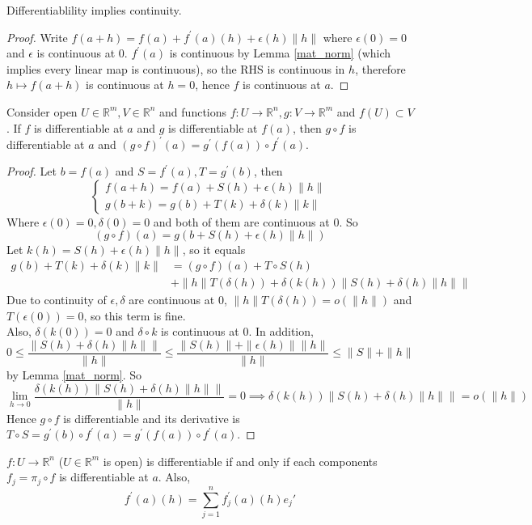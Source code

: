 \begin{proposition}
    Differentiablility implies continuity.
\end{proposition}
\begin{proof}
    Write $f(a+h)=f(a)+f^\prime(a)(h)+\epsilon(h)\|h\|$ where $\epsilon(0)=0$ and $\epsilon$ is continuous at $0$.
    $f^\prime(a)$ is continuous by Lemma \ref{mat_norm} (which implies every linear map is continuous), so the RHS is continuous in $h$, therefore $h\mapsto f(a+h)$ is continuous at $h=0$, hence $f$ is continuous at $a$.
\end{proof}
\begin{proposition}
    Consider open $U\in\mathbb R^m,V\in\mathbb R^n$ and functions $f:U\to\mathbb R^n,g:V\to\mathbb R^m$ and $f(U)\subset V$.
    If $f$ is differentiable at $a$ and $g$ is differentiable at $f(a)$, then $g\circ f$ is differentiable at $a$ and $(g\circ f)^\prime(a)=g^\prime(f(a))\circ f^\prime(a)$.
\end{proposition}
\begin{proof}
    Let $b=f(a)$ and $S=f^\prime(a),T=g^\prime(b)$, then
    $$
    \begin{cases}
        f(a+h)=f(a)+S(h)+\epsilon(h)\|h\|\\
        g(b+k)=g(b)+T(k)+\delta(k)\|k\|
    \end{cases}
    $$
    Where $\epsilon(0)=0,\delta(0)=0$ and both of them are continuous at $0$.
    So 
    $$(g\circ f)(a)=g(b+S(h)+\epsilon(h)\|h\|)$$
    Let $k(h)=S(h)+\epsilon(h)\|h\|$, so it equals
    \begin{align*}
        g(b)+T(k)+\delta(k)\|k\|&=(g\circ f)(a)+T\circ S(h)\\
        &+\|h\|T(\delta(h))+\delta(k(h))\|S(h)+\delta(h)\|h\|\|
    \end{align*}
    Due to continuity of $\epsilon,\delta$ are continuous at $0$, $\|h\|T(\delta(h))=o(\|h\|)$ and $T(\epsilon(0))=0$, so this term is fine.\\
    Also, $\delta(k(0))=0$ and $\delta\circ k$ is continuous at $0$.
    In addition,
    $$0\le \frac{\|S(h)+\delta(h)\|h\|\|}{\|h\|}\le\frac{\|S(h)\|+\|\epsilon(h)\|\|h\|}{\|h\|}\le \|S\|+\|h\|$$
    by Lemma \ref{mat_norm}.
    So
    $$\lim_{h\to 0}\frac{\delta(k(h))\|S(h)+\delta(h)\|h\|\|}{\|h\|}=0\implies \delta(k(h))\|S(h)+\delta(h)\|h\|\|=o(\|h\|)$$
    Hence $g\circ f$ is differentiable and its derivative is $T\circ S=g^\prime (b)\circ f^\prime(a)=g^\prime (f(a))\circ f^\prime(a)$.
\end{proof}
\begin{proposition}\label{component_diff}
    $f:U\to\mathbb R^n$ ($U\in\mathbb R^m$ is open) is differentiable if and only if each components $f_j=\pi_j\circ f$ is differentiable at $a$.
    Also,
    $$f^\prime(a)(h)=\sum_{j=1}^nf_j^\prime(a)(h)e_j'$$
\end{proposition}
